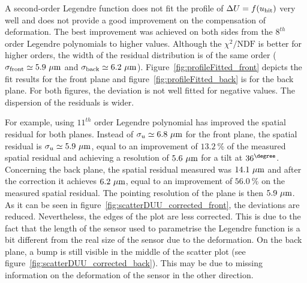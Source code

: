       A second-order Legendre function does not fit the profile of $\Delta U=f(u_{\rm{hit}})$ very well and does not provide a good improvement on the compensation of deformation.
      The best improvement was achieved on both sides from the $8^{th}$ order Legendre polynomials to higher values.
      Although the $\chi^2 \text{/NDF}$ is better for higher orders, the width of the residual distribution is of the same order ($\sigma_{\rm{front}}\simeq 5.9~\rm{\mu m}$ and $\sigma_{\rm{back}} \simeq 6.2~\rm{\mu m}$).
      Figure~\ref{fig:profileFitted_front} depicts the fit results for the front plane and figure~\ref{fig:profileFitted_back} is for the back plane.
      For both figures, the deviation is not well fitted for negative values.
      The dispersion of the residuals is wider. 

      For example, using $11^{th}$ order Legendre polynomial has improved the spatial residual for both planes. 
      Instead of $\sigma_{u} \simeq 6.8~\rm{\mu m}$ for the front plane, the spatial residual is $\sigma_{u} \simeq 5.9~\rm{\mu m}$, equal to an improvement of $13.2~\%$ of the measured spatial residual and achieving a resolution of $5.6~\rm{\mu m}$ for a tilt at $36^{\degree}$.
      Concerning the back plane, the spatial residual measured was $14.1~\rm{\mu m}$ and after the correction it achieves $6.2~\rm{\mu m}$, equal to an improvement of $56.0~\%$ on the measured spatial residual.
      The pointing resolution of the plane is then $5.9~\rm{\mu m}$.
      As it can be seen in figure~\ref{fig:scatterDUU_corrected_front}, the deviations are reduced. 
      Nevertheless, the edges of the plot are less corrected.
      This is due to the fact that the length of the sensor used to parametrise the Legendre function is a bit different from the real size of the sensor due to the deformation.
      On the back plane, a bump is still visible in the middle of the scatter plot (see figure~\ref{fig:scatterDUU_corrected_back}).
      This may be due to missing information on the deformation of the sensor in the other direction.

